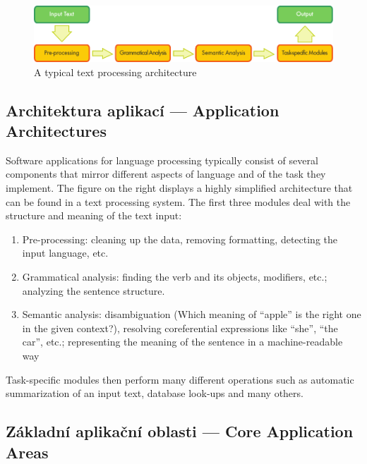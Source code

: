 \documentclass[]{../../metanetpaper}
\begin{document}
\begin{multicols}{2}
\begin{figure}[b]
  \center
  \includegraphics[width=\textwidth]{../_media/english/text_processing_app_architecture}
  \caption{A typical text processing architecture}
  \label{fig:textprocessingarch_en}
\end{figure}


\subsection{Architektura aplikací --- Application Architectures}

Software applications for language processing typically consist of several components that mirror different aspects of language and of the task they implement. The figure on the right displays a highly simplified architecture that can be found in a text processing system. The first three modules deal with the structure and meaning of the text input:
\begin{enumerate}
  \item Pre-processing: cleaning up the data, removing formatting, detecting the input language, etc.
  \item Grammatical analysis: finding the verb and its objects, modifiers, etc.; analyzing the sentence structure.
  \item Semantic analysis: disambiguation (Which meaning of “apple” is the right one in the given context?), resolving coreferential expressions like “she”, “the car”, etc.; representing the meaning of the sentence in a machine-readable way
\end{enumerate}
Task-specific modules then perform many different operations such as automatic summarization of an input text, database look-ups and many others.
  
\subsection{Základní aplikační oblasti --- Core Application Areas}


\end{multicols}
\end{document}
